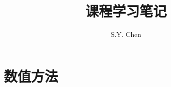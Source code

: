 \documentclass[lang=cn,12pt, scheme=chinese]{elegantbook}
\title{课程学习笔记}
\author{S.Y. Chen}
\begin{document}
\maketitle

\frontmatter
\tableofcontents

\mainmatter




\part{数值方法}

\end{document}
